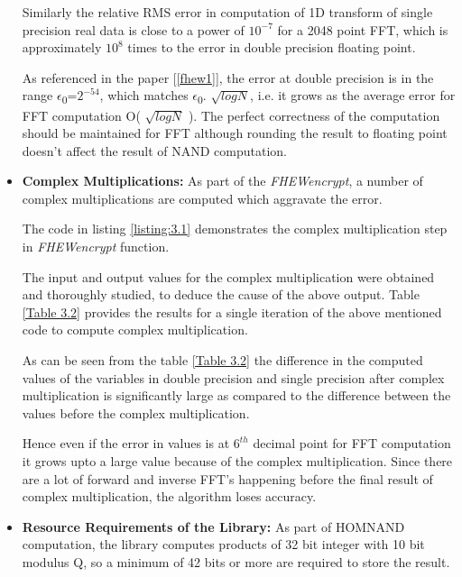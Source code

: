 \begin{itemize}

Similarly the relative RMS error in computation of 1D transform of single precision real data is close to a power of $10^{-7}$ for a 2048 point FFT, which is approximately $10^{8}$ times to the error in double precision floating point. 


As referenced in the paper [\ref{fhew1}], the error at double precision is in the range $\epsilon$\textsubscript{0}=$2^{-54}$, which matches $\epsilon$\textsubscript{0}.
\begin{math}
\sqrt{log N}
\end{math}, i.e. it grows as the average error for FFT computation O(
\begin{math}
\sqrt{log N}
\end{math}
). The perfect correctness of the computation should be maintained for FFT although rounding the result to floating point doesn't affect the result of NAND computation.
\item
\textbf{Complex Multiplications:}
As part of the \textit{FHEWencrypt}, a number of complex multiplications are computed which aggravate the error.

The code in listing \ref{listing:3.1} demonstrates the complex multiplication step in \textit{FHEWencrypt} function.




\vspace{0.5cm}
 \noindent The input and output values for the complex multiplication were obtained and thoroughly studied, to deduce the cause of the above output. 
\noindent Table \ref{Table 3.2} provides the results for a single iteration of the above mentioned code to compute complex multiplication.

\vspace{0.25cm}



\noindent As can be seen from the table \ref{Table 3.2} the difference in the computed values of the variables in double precision and single precision after complex multiplication is significantly large as compared to the difference between the values before the complex multiplication.

\noindent Hence even if the error in values is at $6^{th}$ decimal point for FFT computation it grows upto a large value because of the complex multiplication. Since there are a lot of forward and inverse FFT's happening before the final result of complex multiplication, the algorithm loses accuracy. 
\item
\textbf{Resource Requirements of the Library:} As part of HOMNAND computation, the library computes products of 32 bit integer with 10 bit modulus Q, so a minimum of 42 bits or more are required to store the result.
\end{itemize}

